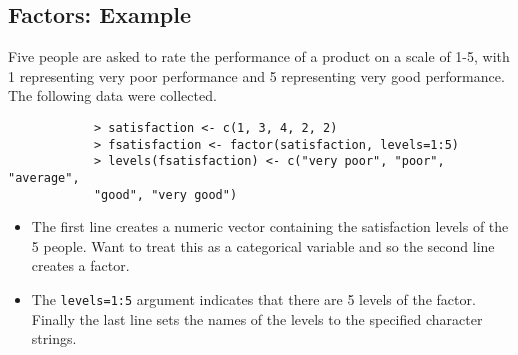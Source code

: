\documentclass[a4paper,12pt]{article}
\begin{document}
		\subsection{Factors: Example}
		Five people are asked to rate the performance of a product on a
		scale of 1-5, with 1 representing very poor performance and 5
		representing very good performance. The following data were
		collected.
		\begin{framed}
			\begin{verbatim}
			> satisfaction <- c(1, 3, 4, 2, 2)
			> fsatisfaction <- factor(satisfaction, levels=1:5)
			> levels(fsatisfaction) <- c("very poor", "poor", "average",
			"good", "very good")
	\end{verbatim}
	\end{framed}	%
		\begin{itemize}
			\item The first line creates a numeric vector containing the satisfaction
			levels of the 5 people. Want to treat this as a categorical variable
			and so the second line creates a factor. 
			\item The \texttt{levels=1:5} argument
			indicates that there are 5 levels of the factor. Finally the last line
			sets the names of the levels to the specified character strings.
		\end{itemize}
		
\end{document}
